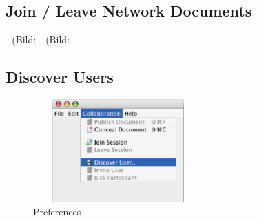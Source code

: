 \documentclass[11pt,a4paper]{article}
\begin{document}
\subsection{Join / Leave Network Documents}

- (Bild: %
- (Bild: %

\subsection{Discover Users}

\begin{figure}[H]
\begin{center}
  \includegraphics[height=1.56in, width=2.56in]{../images/usermanual/nmenu_collaboration_discover.bmp.eps}
\caption{Preferences}
\label{default}
\end{center}
\end{figure}
\end{document}
